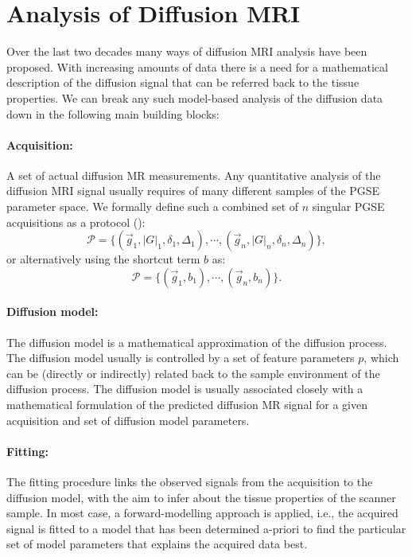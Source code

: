 \section{Analysis of Diffusion MRI}
Over the last two decades many ways of diffusion MRI analysis have been proposed. With increasing amounts of data there is a need for a mathematical description of the diffusion signal that can be referred back to the tissue properties. We can break any such model-based analysis of the diffusion data down in the following main building blocks: 

\paragraph{Acquisition:} A set of actual diffusion MR measurements. Any quantitative analysis of the diffusion MRI signal usually requires of many different samples of the PGSE parameter space. We formally define such a combined set of $n$ singular PGSE acquisitions as a protocol (\prot):
\begin{equation}
	\mathcal{P} = \{(\vec{g}_1,|G|_1,\delta_1,\Delta_1),\cdots,(\vec{g}_n,|G|_n,\delta_n,\Delta_n)\},
\end{equation}
or alternatively using the shortcut term $b$ as:
\begin{equation*}		
	\mathcal{P} = \{(\vec{g}_1,b_1),\cdots,(\vec{g}_n,b_n)\}.
\end{equation*}
\paragraph{Diffusion model:} The diffusion model is a mathematical approximation of the diffusion process. The diffusion model usually is controlled by a set of feature parameters $p$, which can be (directly or indirectly) related back to the sample environment of the diffusion process. The diffusion model is usually associated closely with a mathematical formulation of the predicted diffusion MR signal for a given acquisition and set of diffusion model parameters.
\paragraph{Fitting:} The fitting procedure links the observed signals from the acquisition to the diffusion model, with the aim to infer about the tissue properties of the scanner sample. In most case, a forward-modelling approach is applied, i.e., the acquired signal is fitted to a model that has been determined a-priori to find the particular set of model parameters that explains the acquired data best.  


